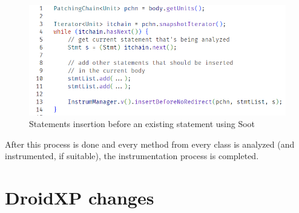 
\begin{figure}
    \centering
    \includegraphics{img/apicall_insert.png}
    \caption{Statements insertion before an existing statement using Soot}
    \label{lst:apitracker-stmt-insert}
\end{figure}

				

    



After this process is done and every method from every class is analyzed (and instrumented, if suitable), the instrumentation process is completed.

\section{DroidXP changes}

